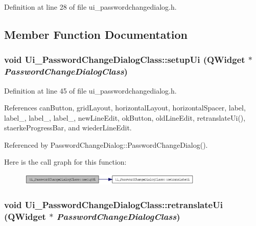 Definition at line 28 of file ui\_\-passwordchangedialog.h.

\subsection{Member Function Documentation}
\hypertarget{class_ui___password_change_dialog_class_6f704152a5246469761f4ab6500b53a5}{
\subsubsection[setupUi]{\setlength{\rightskip}{0pt plus 5cm}void Ui\_\-PasswordChangeDialogClass::setupUi (QWidget $\ast$ {\em PasswordChangeDialogClass})}}
\label{class_ui___password_change_dialog_class_6f704152a5246469761f4ab6500b53a5}




Definition at line 45 of file ui\_\-passwordchangedialog.h.

References canButton, gridLayout, horizontalLayout, horizontalSpacer, label, label\_, label\_, label\_, newLineEdit, okButton, oldLineEdit, retranslateUi(), staerkeProgressBar, and wiederLineEdit.

Referenced by PasswordChangeDialog::PasswordChangeDialog().

Here is the call graph for this function:\nopagebreak
\begin{figure}[H]
\begin{center}
\leavevmode
\includegraphics[width=249pt]{class_ui___password_change_dialog_class_6f704152a5246469761f4ab6500b53a5_cgraph}
\end{center}
\end{figure}
\hypertarget{class_ui___password_change_dialog_class_65ba8872fab87cd6e9d798b2ff957f60}{
\subsubsection[retranslateUi]{\setlength{\rightskip}{0pt plus 5cm}void Ui\_\-PasswordChangeDialogClass::retranslateUi (QWidget $\ast$ {\em PasswordChangeDialogClass})}}
\label{class_ui___password_change_dialog_class_65ba8872fab87cd6e9d798b2ff957f60}




